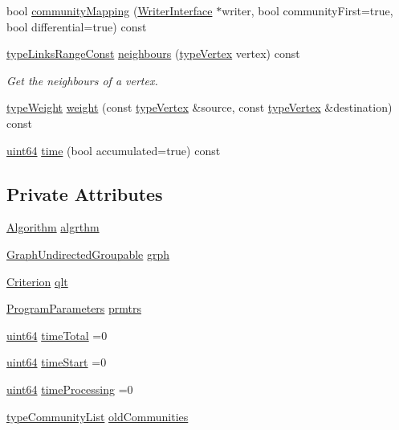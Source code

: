 \begin{DoxyCompactItemize}
\item 
bool \hyperlink{classDynCommBase_a75ed5e0546d756a3b327f41e292620b2}{community\+Mapping} (\hyperlink{classWriterInterface}{Writer\+Interface} $\ast$writer, bool community\+First=true, bool differential=true) const
\item 
\hyperlink{graphInterface_8h_ae8d27008f15586bbf419af7ad2e0a48a}{type\+Links\+Range\+Const} \hyperlink{classDynCommBase_a3500faab82a0547422b2202b79f49718}{neighbours} (\hyperlink{edge_8h_a5fbd20c46956d479cb10afc9855223f6}{type\+Vertex} vertex) const
\begin{DoxyCompactList}\small\item\em Get the neighbours of a vertex. \end{DoxyCompactList}\item 
\hyperlink{edge_8h_a2e7ea3be891ac8b52f749ec73fee6dd2}{type\+Weight} \hyperlink{classDynCommBase_ae48a572da3c7b375429e96e717b15787}{weight} (const \hyperlink{edge_8h_a5fbd20c46956d479cb10afc9855223f6}{type\+Vertex} \&source, const \hyperlink{edge_8h_a5fbd20c46956d479cb10afc9855223f6}{type\+Vertex} \&destination) const
\item 
\hyperlink{systemDefines_8h_abc0f5bc07737e498f287334775dff2b6}{uint64} \hyperlink{classDynCommBase_a5b40eb14cef877fde1db8b6476f6a2ce}{time} (bool accumulated=true) const
\end{DoxyCompactItemize}
\subsection*{Private Attributes}
\begin{DoxyCompactItemize}
\item 
\hyperlink{classAlgorithm}{Algorithm} \hyperlink{classDynCommBase_a966f54b7ba340fa782146659998760ed}{algrthm}
\item 
\hyperlink{classGraphUndirectedGroupable}{Graph\+Undirected\+Groupable} \hyperlink{classDynCommBase_ae79d443436131554acb4b3ed24908701}{grph}
\item 
\hyperlink{classCriterion}{Criterion} \hyperlink{classDynCommBase_a6de9b4c868b4b8ca2923db6f6b1f08f7}{qlt}
\item 
\hyperlink{structProgramParameters}{Program\+Parameters} \hyperlink{classDynCommBase_a61a92fd07b37a8153fda9cfebd779dc4}{prmtrs}
\item 
\hyperlink{systemDefines_8h_abc0f5bc07737e498f287334775dff2b6}{uint64} \hyperlink{classDynCommBase_ac796111a001f3c815d4b72e66da47cc2}{time\+Total} =0
\item 
\hyperlink{systemDefines_8h_abc0f5bc07737e498f287334775dff2b6}{uint64} \hyperlink{classDynCommBase_a7795433997aa908ce2b8be2b3f15aba0}{time\+Start} =0
\item 
\hyperlink{systemDefines_8h_abc0f5bc07737e498f287334775dff2b6}{uint64} \hyperlink{classDynCommBase_ae63166e1cbb91574ff23e4c667fad445}{time\+Processing} =0
\item 
\hyperlink{graphUndirectedGroupable_8h_a8d8ff0ef0315e7cd3b62e467487cd0e1}{type\+Community\+List} \hyperlink{classDynCommBase_ac8cd68d0bff480bc59878668369aa2a5}{old\+Communities}
\end{DoxyCompactItemize}
